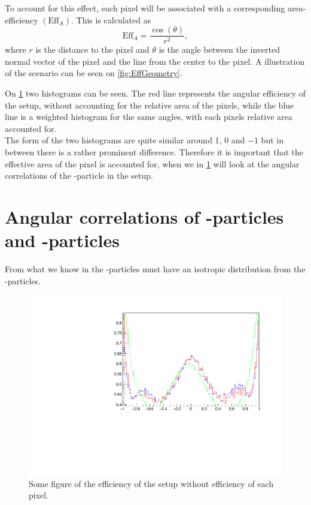 To account for this effect, each pixel will be associated with a corresponding area-efficiency $(\text{Eff}_A)$.
This is calculated as 
\begin{equation}
\text{Eff}_A = \dfrac{\cos(\theta)}{r^2 },
\end{equation}
where $r$ is the distance to the pixel and $\theta$ is the angle between the inverted normal vector of the pixel and the line from the center to the pixel. A illustration of the scenario can be seen on \cref{fig:EffGeometry}.

On \cref{fig:effwithweight} two histograms can be seen. The red line represents the angular efficiency of the setup, without accounting for the relative area of the pixels, while the blue line is a weighted histogram for the same angles, with each pixels relative area accounted for. \\
The form of the two histograms are quite similar around 1, 0 and $-1$ but in between there is a rather prominent difference. Therefore it is important that the effective area of the pixel is accounted for, when we in \cref{sec:betaAngle} will look at the angular correlations of the \be-particle in the setup. 



\section{Angular correlations of \al-particles and \be-particles}
\label{sec:betaAngle}
From what we know in  the \be-particles must have an isotropic distribution from the \al-particles. 

\begin{figure}[h]
	\centering
	\includegraphics[width=\linewidth]{../figures/betaAngles/dataEffNormWithWeights.pdf}
	\caption{Some figure of the efficiency of the setup without efficiency of each pixel. }
	\label{fig:effwithweight}
\end{figure}